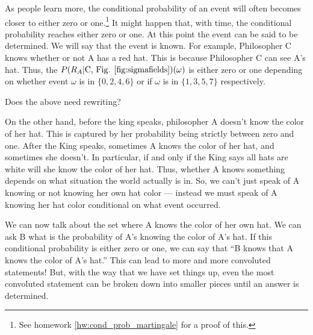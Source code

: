 \documentclass[14pt]{extarticle}
\newcommand{\notes}{}
\begin{document}
As people learn more, the conditional probability of an event will
often becomes closer to either zero or one.\footnote{See homework
  \ref{hw:cond_prob_martingale} for a proof of this.} It might happen
that, with time, the conditional probability reaches either
zero or one.  At this point the event can be said to be determined.
We will say that the event is known.  For example, Philosopher C knows
whether or not A has a red hat.  This is because Philosopher C can
see A's hat.  Thus, the $P(R_A|\hbox{C, Fig.
  \ref{fig:sigmafields}})(\omega)$ is either zero or one depending on
whether event $\omega$ is in $\{ 0,2,4,6\}$ or if $\omega$ is in
$\{1,3,5,7\}$ respectively.

{\notes Does the above need rewriting?}

On the other hand, before the king speaks, philosopher A doesn't know
the color of her hat.  This is captured by her probability being
strictly between zero and one.  After the King speaks, sometimes A
knows the color of her hat, and sometimes she doesn't.  In particular,
if and only if the King says all hats are white will she know the
color of her hat.  Thus, whether A knows something depends on what
situation the world actually is in.  So, we can't just speak of A
knowing or not knowing her own hat color --- instead we must speak of A
knowing her hat color conditional on what event occurred.

 We can now talk about the set where A knows the color of her own
hat.  We can ask B what is the probability of A's knowing the color of
A's hat.  If this conditional probability is either zero or one, we
can say that ``B knows that A knows the color of A's hat.''  This can
lead to more and more convoluted statements!  But, with the way that
we have set things up, even the most convoluted statement can be
broken down into smaller pieces until an answer is determined.
\end{document}
